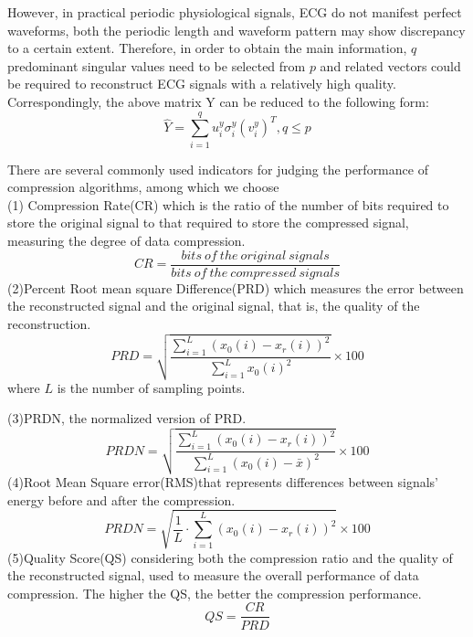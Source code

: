 \documentclass[journal]{IEEEtran}
\begin{document}
However, in practical periodic physiological signals, ECG do not manifest perfect waveforms, both the periodic length and waveform pattern may show discrepancy to a certain extent. Therefore, in order to obtain the main information, $q$ predominant singular values need to be selected from $p$ and related vectors could be required to reconstruct ECG signals with a relatively high quality. Correspondingly, the above matrix Y can be reduced to the following form:
\begin{equation}
\hat Y=\sum\limits_{i=1}^{q}u_{i}^{y}\sigma_{i}^{y}(v_{i}^{y})^{T},q\leq p
\end{equation}

There are several commonly used indicators for judging the performance of compression algorithms, among which we choose\\
(1) Compression Rate(CR) which is the ratio of the number of bits required to store the original signal to that required to store the compressed signal, measuring the degree of data compression.
\begin{equation}
CR=\frac{bits~of~the~original~signals}{bits~of~the~compressed~signals}
\end{equation}
(2)Percent Root mean square Difference(PRD) which measures the error between the reconstructed signal and the original signal, that is, the quality of the reconstruction.
\begin{equation}
PRD=\sqrt{\frac{\sum\limits_{i=1}^{L}(x_0(i)-x_r(i))^2}{\sum\limits_{i=1}^{L}x_0(i)^2}} \times 100
\end{equation}
where $L$ is the number of sampling points.

(3)PRDN, the normalized version of PRD.
\begin{equation}
PRDN=\sqrt{\frac{\sum\limits_{i=1}^{L}(x_0(i)-x_r(i))^2}{\sum\limits_{i=1}^{L}(x_0(i)-\bar{x})^2}}\times 100
\end{equation}
(4)Root Mean Square error(RMS)that represents differences between signals' energy before and after the compression.
\begin{equation}
PRDN=\sqrt{\frac{1}{L} \cdot \sum\limits_{i=1}^{L}(x_0(i)-x_r(i))^2} \times 100
\end{equation}
(5)Quality Score(QS) considering both the compression ratio and the quality of the reconstructed signal, used to measure the overall performance of data compression. The higher the QS, the better the compression performance.
\begin{equation}
QS=\frac{CR}{PRD}
\end{equation}
\end{document}
